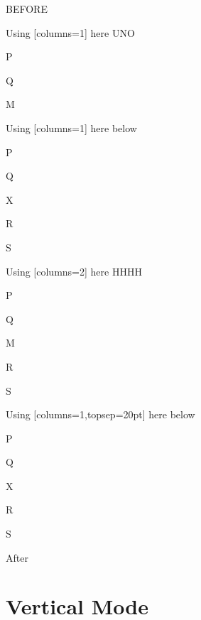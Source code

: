 \documentclass[10pt]{article}
\begin{document}
BEFORE
\begin{enumext}[columns=2]
\item Using [columns=1] here UNO
  \begin{enumext}[columns=1,topsep=20pt,partopsep=20pt]%
     \item  P \item Q \item M %
  \end{enumext}

\item Using [columns=1] here below
\begin{enumext}[columns=1,topsep=20pt]%
     \item  P \item Q \item X  \item R \item S
  \end{enumext}

\columnbreak

\item Using [columns=2] here HHHH
  \begin{enumext}[columns=2,topsep=20pt,partopsep=20pt]%
    \item  P \item Q \item M \item R \item S
  \end{enumext}

\item Using [columns=1,topsep=20pt] here below
\begin{enumext}[columns=1,topsep=20pt]%
     \item  P \item Q \item X  \item R \item S
  \end{enumext}

\end{enumext}
After

\newpage
\section*{Vertical Mode}
\end{document}
